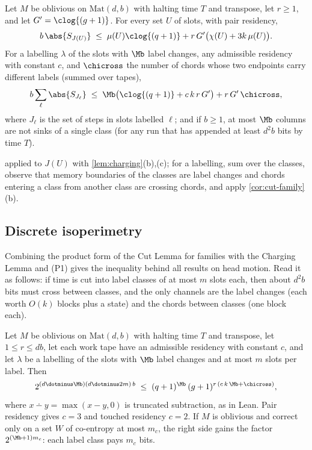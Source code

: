 \begin{corollary}\label{cor:slot-cut}
Let $M$ be oblivious on $\mathrm{Mat}(d,b)$ with halting time $T$ and transpose, let $r\ge1$, and
let $G'=\clog{(g+1)}$. For every set $U$ of slots, with pair residency,
\[
  b\,\abs{S_{J(U)}}\;\le\;\mu(U)\clog{(q+1)}+r\,G'\bigl(\chi(U)+3k\,\mu(U)\bigr).
\]
For a labelling $\lambda$ of the slots with $\Mb$ label changes, any admissible residency with
constant $c$, and $\chicross$ the number of chords whose two endpoints carry different labels
(summed over tapes),
\[
  b\sum_{\ell}\abs{S_{J_\ell}}\;\le\;\Mb\bigl(\clog{(q+1)}+c\,k\,r\,G'\bigr)+r\,G'\,\chicross,
\]
where $J_\ell$ is the set of steps in slots labelled $\ell$; and if $b\ge1$, at most $\Mb$
columns are not sinks of a single class (for any run that has appended at least $d^2b$ bits by time $T$).
\end{corollary}

\begin{outline}
 applied to $J(U)$ with \cref{lem:charging}(b),(c); for a labelling, sum over the
classes, observe that memory boundaries of the classes are label changes and chords entering a
class from another class are crossing chords, and apply \cref{cor:cut-family}(b).
\end{outline}

\subsection{Discrete isoperimetry}

Combining the product form of the Cut Lemma for families with the Charging Lemma and (P1) gives the
inequality behind all results on head motion.
Read it as follows: if time is cut into label classes of at most $m$ slots each, then about
$d^2b$ bits must cross between classes, and the only channels are the label changes (each worth
$O(k)$ blocks plus a state) and the chords between classes (one block each).

\begin{corollary}\label{cor:isoperimetry}
Let $M$ be oblivious on $\mathrm{Mat}(d,b)$ with halting time $T$ and transpose, let
$1\le r\le db$, let each work tape have an admissible residency with constant $c$, and let
$\lambda$ be a labelling of the slots with $\Mb$ label changes and at most $m$ slots per label.
Then
\[
  2^{(d\dotminus\Mb)(d\dotminus 2m)\,b}\;\le\;(q+1)^{\Mb}\,(g+1)^{r\,(c\,k\,\Mb+\chicross)},
\]
where $x\dotminus y=\max(x-y,0)$ is truncated subtraction, as in Lean.
Pair residency gives $c=3$ and touched residency $c=2$. If $M$ is oblivious and correct only on
a set $W$ of co-entropy at most $m_c$, the right side gains the factor $2^{(\Mb+1)m_c}$: each
label class pays $m_c$ bits.
\end{corollary}

